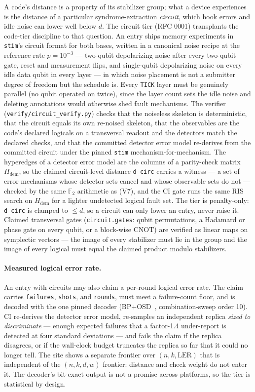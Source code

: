 \documentclass[11pt]{article}
\newcommand{\GF}{\mathbb{F}_2}
\begin{document}
	A code's distance is a property of its stabilizer group; what a device
	experiences is the distance of a particular syndrome-extraction
	\emph{circuit}, which hook errors and idle noise can lower well below
	$d$. The circuit tier (RFC 0001) transplants the code-tier discipline to
	that question. An entry ships memory experiments in \texttt{stim}'s
	circuit format for both bases, written in a canonical noise recipe at
	the reference rate $p=10^{-3}$ --- two-qubit depolarizing noise after
	every two-qubit gate, reset and measurement flips, and single-qubit
	depolarizing noise on every idle data qubit in every layer --- in which
	noise placement is not a submitter degree of freedom but the schedule
	is. Every \texttt{TICK} layer must be genuinely parallel (no qubit
	operated on twice), since the layer count sets the idle noise and
	deleting annotations would otherwise shed fault mechanisms. The
	verifier (\texttt{verify/circuit\_verify.py}) checks that the noiseless
	skeleton is deterministic, that the circuit equals its own re-noised
	skeleton, that the observables are the code's declared logicals on a
	transversal readout and the detectors match the declared checks, and
	that the committed detector error model re-derives from the committed
	circuit under the pinned \texttt{stim} mechanism-for-mechanism. The
	hyperedges of a detector error model are the columns of a parity-check
	matrix $H_{\mathrm{dem}}$, so the claimed circuit-level distance
	\texttt{d\_circ} carries a witness --- a set of error mechanisms whose
	detector sets cancel and whose observable sets do not --- checked by
	the same $\GF$ arithmetic as (V7), and the CI gate runs the same RIS
	search on $H_{\mathrm{dem}}$ for a lighter undetected logical fault
	set. The tier is penalty-only: \texttt{d\_circ} is clamped to $\le d$,
	so a circuit can only lower an entry, never raise it. Claimed
	transversal gates (\texttt{circuit.gates}: qubit permutations, a
	Hadamard or phase gate on every qubit, or a block-wise CNOT) are
	verified as linear maps on symplectic vectors --- the image of every
	stabilizer must lie in the group and the image of every logical must
	equal the claimed product modulo stabilizers.

	\paragraph{Measured logical error rate.} An entry with circuits may also
	claim a per-round logical error rate. The claim carries
	\texttt{failures}, \texttt{shots}, and \texttt{rounds}, must meet a
	failure-count floor, and is decoded with the one pinned decoder
	(BP+OSD~\cite{roffe2020decoding}, combination-sweep order 10). CI
	re-derives the detector error model, re-samples an independent replica
	\emph{sized to discriminate} --- enough expected failures that a
	factor-1.4 under-report is detected at four standard deviations --- and
	fails the claim if the replica disagrees, or if the wall-clock budget
	truncates the replica so far that it could no longer tell. The site
	shows a separate frontier over $(n,k,\mathrm{LER})$ that is independent
	of the $(n,k,d,w)$ frontier: distance and check weight do not enter it.
	The decoder's bit-exact output is not a promise across platforms, so the
	tier is statistical by design.
\end{document}
